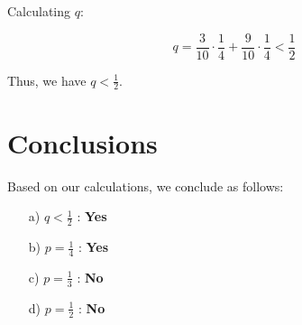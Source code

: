 \documentclass{article}
\begin{document}
Calculating \( q \):

\[
q = \frac{3}{10} \cdot \frac{1}{4} + \frac{9}{10} \cdot \frac{1}{4} < \frac{1}{2}
\]

Thus, we have \( q < \frac{1}{2} \).

\section{Conclusions}
Based on our calculations, we conclude as follows:

\begin{itemize}
    \item[a)] \( q < \frac{1}{2} \) : \textbf{Yes}
    \item[b)] \( p = \frac{1}{4} \) : \textbf{Yes}
    \item[c)] \( p = \frac{1}{3} \) : \textbf{No}
    \item[d)] \( p = \frac{1}{2} \) : \textbf{No}
\end{itemize}
\end{document}
